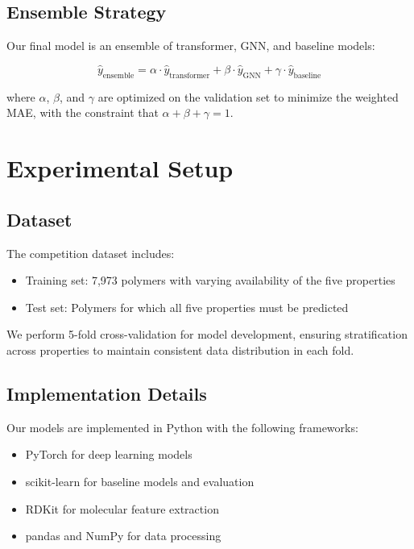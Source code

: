 \documentclass[10pt,twocolumn,letterpaper]{article}
\begin{document}
\subsection{Ensemble Strategy}

Our final model is an ensemble of transformer, GNN, and baseline models:

\begin{equation}
\hat{y}_{\text{ensemble}} = \alpha \cdot \hat{y}_{\text{transformer}} + \beta \cdot \hat{y}_{\text{GNN}} + \gamma \cdot \hat{y}_{\text{baseline}}
\end{equation}

where $\alpha$, $\beta$, and $\gamma$ are optimized on the validation set to minimize the weighted MAE, with the constraint that $\alpha + \beta + \gamma = 1$.

\section{Experimental Setup}

\subsection{Dataset}

The competition dataset includes:
\begin{itemize}
    \item Training set: 7,973 polymers with varying availability of the five properties
    \item Test set: Polymers for which all five properties must be predicted
\end{itemize}

We perform 5-fold cross-validation for model development, ensuring stratification across properties to maintain consistent data distribution in each fold.

\subsection{Implementation Details}

Our models are implemented in Python with the following frameworks:
\begin{itemize}
    \item PyTorch for deep learning models
    \item scikit-learn for baseline models and evaluation
    \item RDKit for molecular feature extraction
    \item pandas and NumPy for data processing
\end{itemize}
\end{document}
